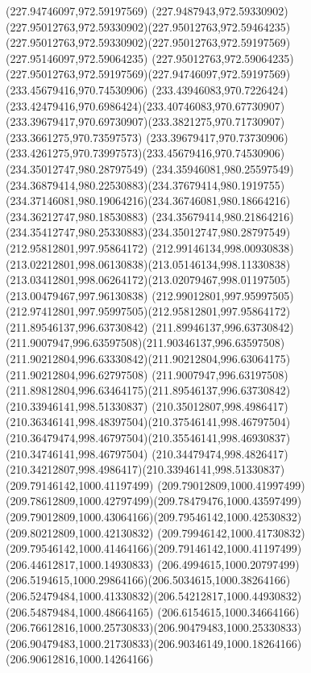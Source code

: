{{		\moveto(227.94746097,972.59197569)
		\curveto(227.9487943,972.59330902)(227.95012763,972.59330902)(227.95012763,972.59464235)
		\curveto(227.95012763,972.59330902)(227.95012763,972.59197569)(227.95146097,972.59064235)
		\curveto(227.95012763,972.59064235)(227.95012763,972.59197569)(227.94746097,972.59197569)
		\moveto(233.45679416,970.74530906)
		\curveto(233.43946083,970.7226424)(233.42479416,970.6986424)(233.40746083,970.67730907)
		\curveto(233.39679417,970.69730907)(233.3821275,970.71730907)(233.3661275,970.73597573)
		\curveto(233.39679417,970.73730906)(233.4261275,970.73997573)(233.45679416,970.74530906)
		\moveto(234.35012747,980.28797549)
		\curveto(234.35946081,980.25597549)(234.36879414,980.22530883)(234.37679414,980.1919755)
		\curveto(234.37146081,980.19064216)(234.36746081,980.18664216)(234.36212747,980.18530883)
		\curveto(234.35679414,980.21864216)(234.35412747,980.25330883)(234.35012747,980.28797549)
		\moveto(212.95812801,997.95864172)
		\curveto(212.99146134,998.00930838)(213.02212801,998.06130838)(213.05146134,998.11330838)
		\curveto(213.03412801,998.06264172)(213.02079467,998.01197505)(213.00479467,997.96130838)
		\curveto(212.99012801,997.95997505)(212.97412801,997.95997505)(212.95812801,997.95864172)
		\moveto(211.89546137,996.63730842)
		\curveto(211.89946137,996.63730842)(211.9007947,996.63597508)(211.90346137,996.63597508)
		\curveto(211.90212804,996.63330842)(211.90212804,996.63064175)(211.90212804,996.62797508)
		\curveto(211.9007947,996.63197508)(211.89812804,996.63464175)(211.89546137,996.63730842)
		\moveto(210.33946141,998.51330837)
		\curveto(210.35012807,998.4986417)(210.36346141,998.48397504)(210.37546141,998.46797504)
		\curveto(210.36479474,998.46797504)(210.35546141,998.46930837)(210.34746141,998.46797504)
		\curveto(210.34479474,998.4826417)(210.34212807,998.4986417)(210.33946141,998.51330837)
		\moveto(209.79146142,1000.41197499)
		\curveto(209.79012809,1000.41997499)(209.78612809,1000.42797499)(209.78479476,1000.43597499)
		\curveto(209.79012809,1000.43064166)(209.79546142,1000.42530832)(209.80212809,1000.42130832)
		\curveto(209.79946142,1000.41730832)(209.79546142,1000.41464166)(209.79146142,1000.41197499)
		\moveto(206.44612817,1000.14930833)
		\curveto(206.4994615,1000.20797499)(206.5194615,1000.29864166)(206.5034615,1000.38264166)
		\curveto(206.52479484,1000.41330832)(206.54212817,1000.44930832)(206.54879484,1000.48664165)
		\curveto(206.6154615,1000.34664166)(206.76612816,1000.25730833)(206.90479483,1000.25330833)
		\curveto(206.90479483,1000.21730833)(206.90346149,1000.18264166)(206.90612816,1000.14264166)
}}
